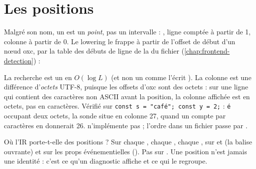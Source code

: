 \section{Les positions}
\label{sec:ir-positions}


Malgré son nom, un  est un \emph{point}, pas un intervalle : , ligne comptée à partir de 1, colonne à partir de 0. Le lowering le frappe à partir de l'offset de début d'un nœud oxc, par la table des débuts de ligne de la  du fichier (\cref{chap:frontend-detection}) :


La recherche est un  en $O(\log L)$ (et non un  comme l'écrit ). La colonne est une différence d'\emph{octets} UTF-8, puisque les offsets d'oxc sont des octets : sur une ligne qui contient des caractères non ASCII avant la position, la colonne affichée est en octets, pas en caractères. Vérifié sur \texttt{const s = "café"; const y = 2;} : \texttt{é} occupant deux octets, la sonde situe  en colonne 27, quand un compte par caractères en donnerait 26.
 n'implémente pas  ; l'ordre dans un fichier passe par .

Où l'IR porte-t-elle des positions ? Sur chaque , chaque , chaque , sur  et  (la balise ouvrante) et sur les props événementielles (). Pas sur . Une position n'est jamais une identité : c'est ce qu'un diagnostic affiche et ce qui le regroupe.


